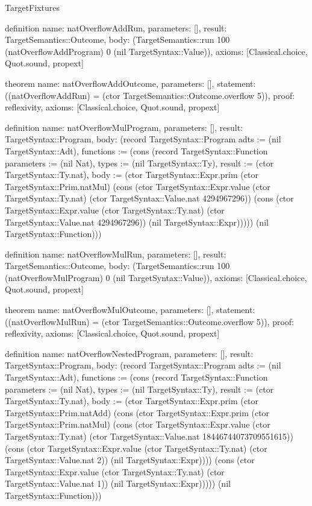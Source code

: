 \begin{lexlean}{TargetFixtures}
\begin{semanticmodule}
definition{
  name: natOverflowAddRun,
  parameters: [],
  result: TargetSemantics::Outcome,
  body: (TargetSemantics::run 100 (natOverflowAddProgram) 0 (nil TargetSyntax::Value)),
  axioms: [Classical.choice, Quot.sound, propext]
}

theorem{
  name: natOverflowAddOutcome,
  parameters: [],
  statement: ((natOverflowAddRun) = (ctor TargetSemantics::Outcome.overflow 5)),
  proof: reflexivity{},
  axioms: [Classical.choice, Quot.sound, propext]
}

definition{
  name: natOverflowMulProgram,
  parameters: [],
  result: TargetSyntax::Program,
  body: (record TargetSyntax::Program {adts := (nil TargetSyntax::Adt), functions := (cons (record TargetSyntax::Function {parameters := (nil Nat), types := (nil TargetSyntax::Ty), result := (ctor TargetSyntax::Ty.nat), body := (ctor TargetSyntax::Expr.prim (ctor TargetSyntax::Prim.natMul) (cons (ctor TargetSyntax::Expr.value (ctor TargetSyntax::Ty.nat) (ctor TargetSyntax::Value.nat 4294967296)) (cons (ctor TargetSyntax::Expr.value (ctor TargetSyntax::Ty.nat) (ctor TargetSyntax::Value.nat 4294967296)) (nil TargetSyntax::Expr))))}) (nil TargetSyntax::Function))})
}

definition{
  name: natOverflowMulRun,
  parameters: [],
  result: TargetSemantics::Outcome,
  body: (TargetSemantics::run 100 (natOverflowMulProgram) 0 (nil TargetSyntax::Value)),
  axioms: [Classical.choice, Quot.sound, propext]
}

theorem{
  name: natOverflowMulOutcome,
  parameters: [],
  statement: ((natOverflowMulRun) = (ctor TargetSemantics::Outcome.overflow 5)),
  proof: reflexivity{},
  axioms: [Classical.choice, Quot.sound, propext]
}

definition{
  name: natOverflowNestedProgram,
  parameters: [],
  result: TargetSyntax::Program,
  body: (record TargetSyntax::Program {adts := (nil TargetSyntax::Adt), functions := (cons (record TargetSyntax::Function {parameters := (nil Nat), types := (nil TargetSyntax::Ty), result := (ctor TargetSyntax::Ty.nat), body := (ctor TargetSyntax::Expr.prim (ctor TargetSyntax::Prim.natAdd) (cons (ctor TargetSyntax::Expr.prim (ctor TargetSyntax::Prim.natMul) (cons (ctor TargetSyntax::Expr.value (ctor TargetSyntax::Ty.nat) (ctor TargetSyntax::Value.nat 18446744073709551615)) (cons (ctor TargetSyntax::Expr.value (ctor TargetSyntax::Ty.nat) (ctor TargetSyntax::Value.nat 2)) (nil TargetSyntax::Expr)))) (cons (ctor TargetSyntax::Expr.value (ctor TargetSyntax::Ty.nat) (ctor TargetSyntax::Value.nat 1)) (nil TargetSyntax::Expr))))}) (nil TargetSyntax::Function))})
}


\end{semanticmodule}
\end{lexlean}
